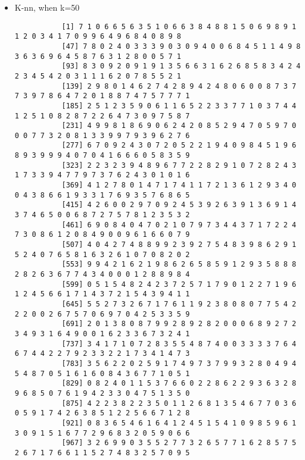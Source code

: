 \documentclass{article}
\begin{document}
\begin{itemize}
\begin{scriptsize}
\begin{verbatim}
		\end{verbatim}
	\end{scriptsize}
	\item K-nn, when k=50\\
	\begin{scriptsize}
		\begin{verbatim}
		   [1] 7 1 0 6 6 5 6 3 5 1 0 6 6 3 8 4 8 8 1 5 0 6 9 8 9 1 1 2 0 3 4 1 7 0 9 9 6 4 9 6 8 4 0 8 9 8
		   [47] 7 8 0 2 4 0 3 3 3 9 0 3 0 9 4 0 0 6 8 4 5 1 1 4 9 8 3 6 3 6 9 6 4 5 8 7 6 3 1 2 8 0 0 5 7 1
		   [93] 8 3 0 9 2 0 9 1 9 1 3 5 6 6 3 1 6 2 6 8 5 8 3 4 2 4 2 3 4 5 4 2 0 3 1 1 1 6 2 0 7 8 5 5 2 1
		   [139] 2 9 8 0 1 4 6 2 7 4 2 8 9 4 2 4 8 0 6 0 0 8 7 3 7 7 3 9 7 8 6 4 7 2 0 1 8 8 7 4 7 5 7 7 7 1
		   [185] 2 5 1 2 3 5 9 0 6 1 1 6 5 2 2 3 3 7 7 1 0 3 7 4 4 1 2 5 1 0 8 2 8 7 2 2 6 4 7 3 0 9 7 5 8 7
		   [231] 4 9 9 8 1 8 6 9 0 6 2 4 2 0 8 5 2 9 4 7 0 5 9 7 0 0 0 7 7 3 2 0 8 1 3 3 9 9 7 9 3 9 6 2 7 6
		   [277] 6 7 0 9 2 4 3 0 7 2 0 5 2 2 1 9 4 0 9 8 4 5 1 9 6 8 9 3 9 9 9 4 0 7 0 4 1 6 6 6 0 5 8 3 5 9
		   [323] 2 2 3 2 3 9 4 8 9 6 7 7 2 2 8 2 9 1 0 7 2 8 2 4 3 1 7 3 3 9 4 7 7 9 7 3 7 6 2 4 3 0 1 0 1 6
		   [369] 4 1 2 7 8 0 1 4 7 1 7 4 1 1 7 2 1 3 6 1 2 9 3 4 0 0 4 3 8 6 6 1 9 3 3 1 7 6 9 3 5 7 6 8 6 5
		   [415] 4 2 6 0 0 2 9 7 0 9 2 4 5 3 9 2 6 3 9 1 3 6 9 1 4 3 7 4 6 5 0 0 6 8 7 2 7 5 7 8 1 2 3 5 3 2
		   [461] 6 9 0 8 4 0 4 7 0 2 1 0 7 9 7 3 4 4 3 7 1 7 2 2 4 7 3 0 8 6 1 2 0 8 4 9 0 0 9 6 1 6 6 0 7 9
		   [507] 4 0 4 2 7 4 8 8 9 9 2 3 9 2 7 5 4 8 3 9 8 6 2 9 1 5 2 4 0 7 6 5 8 1 6 3 2 6 1 0 7 0 8 2 0 2
		   [553] 9 9 4 2 1 6 2 1 9 8 6 2 6 5 8 5 9 1 2 9 3 5 8 8 8 2 8 2 6 3 6 7 7 4 3 4 0 0 0 1 2 8 8 9 8 4
		   [599] 0 5 1 5 4 8 2 4 2 3 7 2 5 7 1 7 9 0 1 2 2 7 1 9 6 1 2 4 5 6 6 1 7 1 4 3 7 2 1 5 4 3 9 4 1 1
		   [645] 5 5 2 7 3 2 6 7 1 7 6 1 1 9 2 3 8 0 8 0 7 7 5 4 2 2 2 0 0 2 6 7 5 7 0 6 9 7 0 4 2 5 3 3 5 9
		   [691] 2 0 1 3 8 0 8 7 9 9 2 8 9 2 8 2 0 0 0 6 8 9 2 7 2 3 4 9 3 1 6 4 9 0 0 1 6 2 3 3 6 7 3 2 4 1
		   [737] 3 4 1 7 1 0 7 2 8 3 5 5 4 8 7 4 0 0 3 3 3 3 7 6 4 6 7 4 4 2 2 7 9 2 3 3 2 2 1 7 3 4 1 4 7 3
		   [783] 3 5 6 2 2 0 2 5 9 1 7 4 9 7 3 7 9 9 3 2 8 0 4 9 4 5 4 8 7 0 5 1 6 1 6 0 8 4 3 6 7 7 1 0 5 1
		   [829] 0 8 2 4 0 1 1 5 3 7 6 6 0 2 2 8 6 2 2 9 3 6 3 2 8 9 6 8 5 0 7 6 1 9 4 2 3 3 0 4 7 5 1 3 5 0
		   [875] 4 2 2 3 8 2 2 3 5 0 1 1 2 6 8 1 3 5 4 6 7 7 0 3 6 0 5 9 1 7 4 2 6 3 8 5 1 2 2 5 6 6 7 1 2 8
		   [921] 0 8 3 6 5 4 6 1 6 4 1 2 4 5 1 5 4 1 0 9 8 5 9 6 1 3 0 9 1 5 1 6 7 7 2 9 6 8 3 2 0 5 9 0 6 6
		   [967] 3 2 6 9 9 0 3 5 5 2 7 7 3 2 6 5 7 7 1 6 2 8 5 7 5 2 6 7 1 7 6 6 1 1 5 2 7 4 8 3 2 5 7 0 9 5

\end{verbatim}
\end{scriptsize}
\end{itemize}
\end{document}
